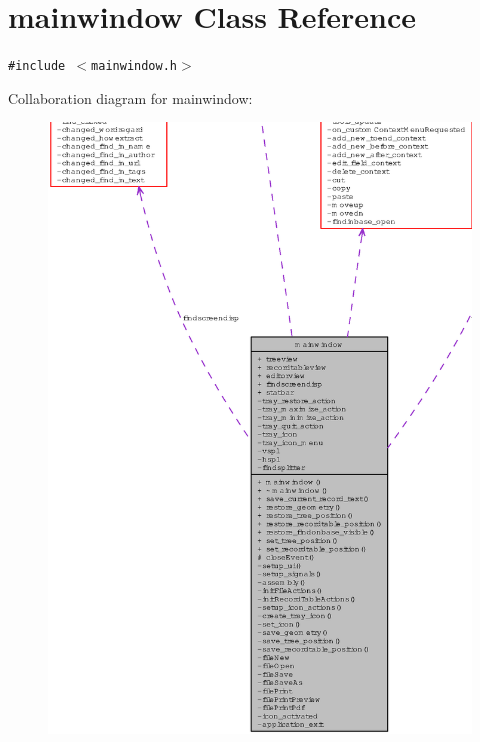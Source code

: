 \section{mainwindow Class Reference}
\label{classmainwindow}
{\tt \#include $<$mainwindow.h$>$}

Collaboration diagram for mainwindow:\begin{figure}[H]
\begin{center}
\leavevmode
\includegraphics[width=407pt]{classmainwindow__coll__graph}
\end{center}
\end{figure}
